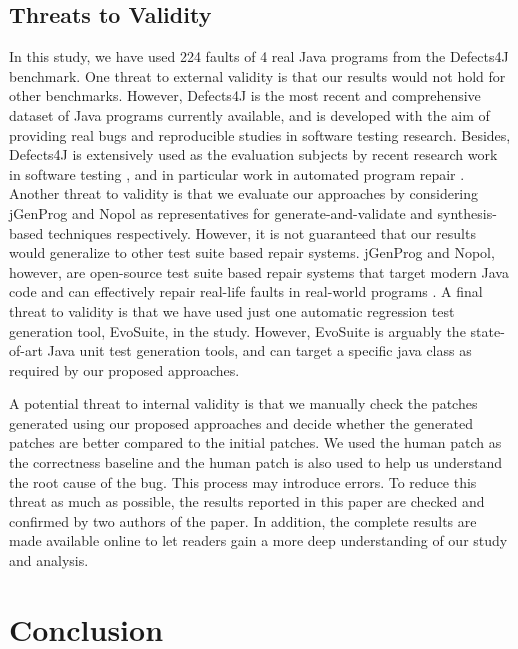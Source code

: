 \documentclass[]{sig-alternate}
\begin{document}
\vspace{-0.5em}
\subsection{Threats to Validity}
In this study, we have used 224 faults of 4 real Java programs from the Defects4J benchmark.
One threat to external validity is that our results would not hold for other benchmarks.  However, Defects4J is the most recent and comprehensive dataset of Java programs currently available, and is developed with the aim of providing real bugs and reproducible studies in software testing research. Besides, Defects4J is extensively used as the evaluation subjects by recent research work in software testing \cite{B.Le:2016:LBF:2931037.2931049,PearsonCJFAEPK2016,Laghari:2016:FSB:2970276.2970308}, and in particular work in automated program repair \cite{defects4j-repair,xiong2016precise}. Another threat to validity is that we evaluate our approaches by considering jGenProg and Nopol as representatives for generate-and-validate and synthesis-based techniques respectively. However, it is not guaranteed that our results would generalize to other test suite based repair systems. jGenProg and Nopol, however, are open-source test suite based repair systems that target modern Java code and can effectively repair real-life faults in real-world programs \cite{defects4j-repair}. A final threat to validity is that we have used just one automatic regression test generation tool, EvoSuite, in the study. However, EvoSuite is arguably the state-of-art Java unit test generation tools, and can target a specific java class as required by our proposed approaches. 

A potential threat to internal validity is that we manually check the patches generated using our proposed approaches and decide whether the generated patches are better compared to the initial patches. We used the human patch as the correctness baseline and the human patch is also used to help us understand the root cause of the bug. This process may introduce errors. To reduce this threat as much as possible, the results reported in this paper are checked and confirmed by two authors of the paper. In addition, the complete results are made available online \cite{replication-site} to let readers gain a more deep understanding of our study and analysis. 

\vspace{-0.5em}
\section{Conclusion}
\end{document}

